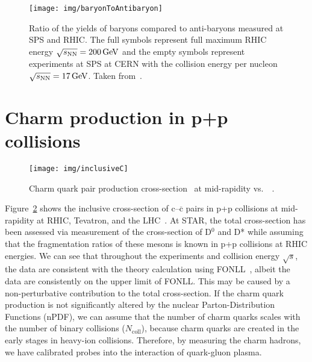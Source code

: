 \begin{figure}
\centering
\texttt{[image: img/baryonToAntibaryon]}
\caption[Ratio of the yields of baryons compared to anti-baryons measured at SPS and~RHIC\@.]{\label{fig:BtoAntiB}Ratio of the yields of baryons compared to anti-baryons measured at SPS and RHIC\@. The full symbols represent full maximum RHIC energy $\sqrt{s_\text{NN}} = \SI{200}{GeV}$ and the empty symbols represent experiments at SPS at CERN with the collision energy per nucleon $\sqrt{s_\text{NN}} = \SI{17}{GeV}$. Taken from~\cite{BtoAntiB}.}

\end{figure}

\section{Charm production in p+p collisions}

\begin{figure}[!htb]
\centering
\texttt{[image: img/inclusiveC]}
\caption[Charm quark pair production cross-section at mid-rapidity vs.\ \pt.]{Charm quark pair production cross-section~\cite{pp500GeVcharm} at mid-rapidity vs.\ \pt~\cite{FONLLcharm,GuannanQM15,ALICEcharm,CDFcharm,inclusiveC}.}
\label{fig:inclusiveC}
\end{figure}

Figure~\ref{fig:inclusiveC} shows the inclusive cross-section of c--$\overline{\mathrm{c}}$ pairs in p+p collisions at mid-rapidity at RHIC, Tevatron, and the LHC~\cite{GuannanQM15,ALICEcharm,CDFcharm,inclusiveC,pp500GeVcharm}\@. At STAR, the total cross-section has been assessed via measurement of the cross-section of D$^0$ and D* while assuming that the fragmentation ratios of these mesons is known in p+p collisions at RHIC energies. We can see that throughout the experiments and collision energy $\sqrt{s}$, the data are consistent with the theory calculation using FONLL~\cite{FONLLcharm}, albeit the data are consistently on the upper limit of FONLL\@. This may be caused by a non-perturbative contribution to the total cross-section. If the charm quark production is not significantly altered by the nuclear Parton-Distribution Functions (nPDF), we can assume that the number of charm quarks scales with the number of binary collisions ($N_\mathrm{coll}$), because charm quarks are created in the early stages in heavy-ion collisions. Therefore, by measuring the charm hadrons, we have calibrated probes into the interaction of quark-gluon plasma.

